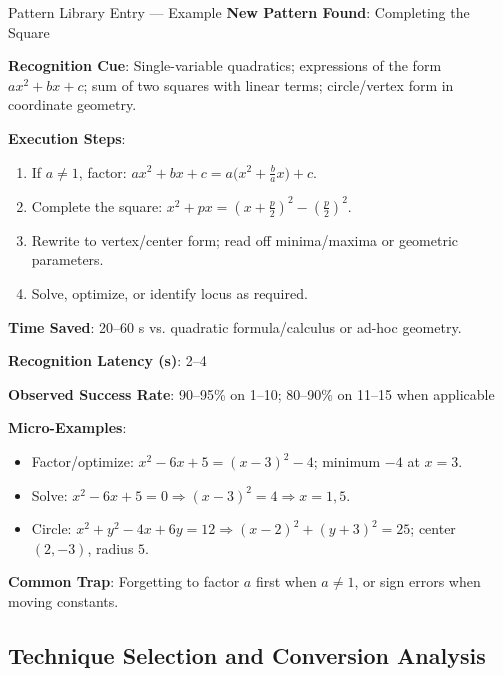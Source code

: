 \documentclass{article}
\begin{document}
\begin{analysisbox}{Pattern Library Entry — Example}
\textbf{New Pattern Found}: Completing the Square

\textbf{Recognition Cue}: Single-variable quadratics; expressions of the form $ax^2+bx+c$; sum of two squares with linear terms; circle/vertex form in coordinate geometry.

\textbf{Execution Steps}:
\begin{enumerate}[nosep]
\item If $a\ne 1$, factor: $ax^2+bx+c = a\big(x^2+\tfrac{b}{a}x\big)+c$.
\item Complete the square: $x^2+px = (x+\tfrac{p}{2})^2 - (\tfrac{p}{2})^2$.
\item Rewrite to vertex/center form; read off minima/maxima or geometric parameters.
\item Solve, optimize, or identify locus as required.
\end{enumerate}

\textbf{Time Saved}: 20--60 s vs. quadratic formula/calculus or ad-hoc geometry.

\textbf{Recognition Latency (s)}: 2--4

\textbf{Observed Success Rate}: 90--95\% on 1--10; 80--90\% on 11--15 when applicable

\textbf{Micro-Examples}:
\begin{itemize}[nosep]
\item Factor/optimize: $x^2-6x+5=(x-3)^2-4$; minimum $-4$ at $x=3$.
\item Solve: $x^2-6x+5=0\Rightarrow (x-3)^2=4\Rightarrow x=1,5$.
\item Circle: $x^2+y^2-4x+6y=12\Rightarrow (x-2)^2+(y+3)^2=25$; center $(2,-3)$, radius $5$.
\end{itemize}

\textbf{Common Trap}: Forgetting to factor $a$ first when $a\ne 1$, or sign errors when moving constants.
\end{analysisbox}


\subsection{Technique Selection and Conversion Analysis}
\end{document}
